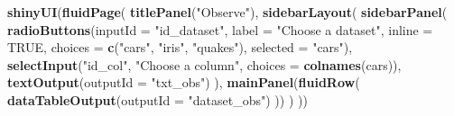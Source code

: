 \documentclass[]{article}
\newenvironment{Shaded}{\begin{snugshade}}{\end{snugshade}}
\newcommand{\KeywordTok}[1]{\textcolor[rgb]{0.13,0.29,0.53}{\textbf{#1}}}
\newcommand{\DataTypeTok}[1]{\textcolor[rgb]{0.13,0.29,0.53}{#1}}
\newcommand{\DecValTok}[1]{\textcolor[rgb]{0.00,0.00,0.81}{#1}}
\newcommand{\StringTok}[1]{\textcolor[rgb]{0.31,0.60,0.02}{#1}}
\newcommand{\OtherTok}[1]{\textcolor[rgb]{0.56,0.35,0.01}{#1}}
\newcommand{\ControlFlowTok}[1]{\textcolor[rgb]{0.13,0.29,0.53}{\textbf{#1}}}
\newcommand{\OperatorTok}[1]{\textcolor[rgb]{0.81,0.36,0.00}{\textbf{#1}}}
\newcommand{\NormalTok}[1]{#1}
\begin{document}
\begin{Shaded}
\begin{Highlighting}[]
\KeywordTok{shinyUI}\NormalTok{(}\KeywordTok{fluidPage}\NormalTok{(}
  \KeywordTok{titlePanel}\NormalTok{(}\StringTok{"Observe"}\NormalTok{),}
  \KeywordTok{sidebarLayout}\NormalTok{(}
    \KeywordTok{sidebarPanel}\NormalTok{(}
      \KeywordTok{radioButtons}\NormalTok{(}\DataTypeTok{inputId =} \StringTok{"id_dataset"}\NormalTok{, }\DataTypeTok{label =} \StringTok{"Choose a dataset"}\NormalTok{, }\DataTypeTok{inline =} \OtherTok{TRUE}\NormalTok{,}
                   \DataTypeTok{choices =} \KeywordTok{c}\NormalTok{(}\StringTok{"cars"}\NormalTok{, }\StringTok{"iris"}\NormalTok{, }\StringTok{"quakes"}\NormalTok{), }\DataTypeTok{selected =} \StringTok{"cars"}\NormalTok{),}
      \KeywordTok{selectInput}\NormalTok{(}\StringTok{"id_col"}\NormalTok{, }\StringTok{"Choose a column"}\NormalTok{, }\DataTypeTok{choices =} \KeywordTok{colnames}\NormalTok{(cars)),}
      \KeywordTok{textOutput}\NormalTok{(}\DataTypeTok{outputId =} \StringTok{"txt_obs"}\NormalTok{)}
\NormalTok{    ),}
    \KeywordTok{mainPanel}\NormalTok{(}\KeywordTok{fluidRow}\NormalTok{(}
      \KeywordTok{dataTableOutput}\NormalTok{(}\DataTypeTok{outputId =} \StringTok{"dataset_obs"}\NormalTok{)}
\NormalTok{    ))}
\NormalTok{  )}
\NormalTok{))}
\end{Highlighting}
\end{Shaded}

\begin{Shaded}
\end{Shaded}
\end{document}
